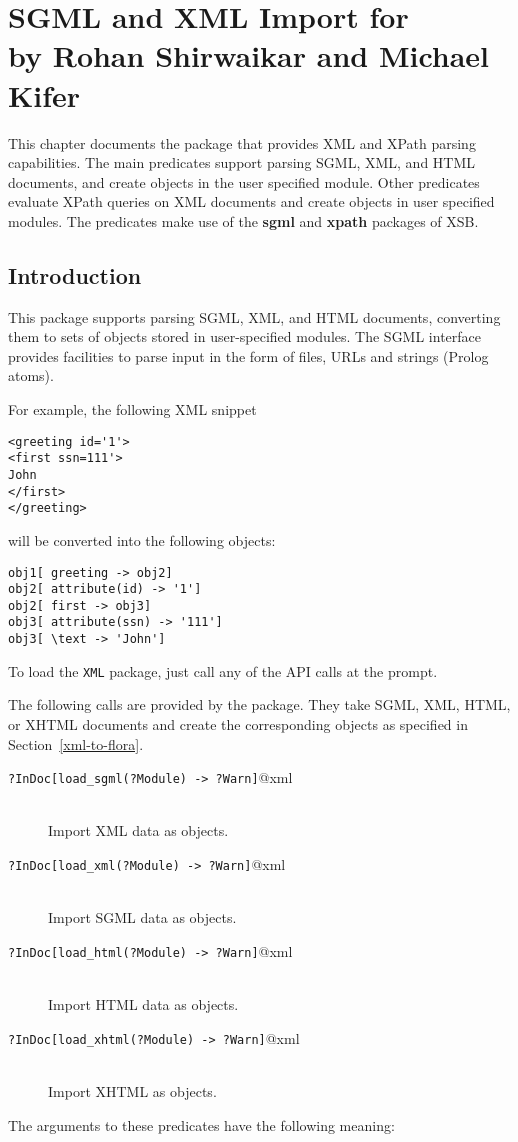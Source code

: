 \chapter[SGML and XML Parser for \FLSYSTEM]
{SGML and XML Import for \FLSYSTEM\\
  {\Large by Rohan Shirwaikar and Michael Kifer}}

This chapter documents the \FLSYSTEM package that provides XML
and XPath
parsing capabilities. The main predicates support parsing
SGML, XML, and HTML documents, and create \FLSYSTEM objects in the user
specified module.
Other predicates evaluate XPath queries
on XML documents and create \FLSYSTEM objects in user specified
modules. The predicates make use of the {\bf sgml} and {\bf xpath}
packages of XSB.



\section{Introduction}\label{sec-xml-intro}

This package supports parsing SGML, XML, and HTML documents,
converting them to sets of \FLSYSTEM objects stored in user-specified
\FLSYSTEM modules. The SGML interface
provides facilities to parse input in the form of files,
URLs and strings (Prolog atoms).  

For example, the following XML snippet

\begin{verbatim}
<greeting id='1'>
<first ssn=111'>
John
</first>
</greeting>
\end{verbatim}

will be converted into the following \FLSYSTEM objects:

\begin{verbatim}
obj1[ greeting -> obj2]
obj2[ attribute(id) -> '1']
obj2[ first -> obj3]
obj3[ attribute(ssn) -> '111']
obj3[ \text -> 'John']
\end{verbatim}

To load the {\tt XML} package, just call any of the API calls
at the \FLSYSTEM prompt.

The following calls are provided by the package.  They
take SGML, XML, HTML, or XHTML documents and create the corresponding
\FLSYSTEM objects as specified in Section~\ref{xml-to-flora}.

\begin{description}
\item[{\tt ?InDoc[load\_sgml(?Module) -> ?Warn]}@\bs{}xml]~~\\
  Import XML data as \FLSYSTEM objects.
\item[{\tt ?InDoc[load\_xml(?Module) -> ?Warn]}@\bs{}xml]~~\\
  Import SGML data as \FLSYSTEM objects.
\item[{\tt ?InDoc[load\_html(?Module) -> ?Warn]}@\bs{}xml]~~\\
  Import HTML data as \FLSYSTEM objects.
\item[{\tt ?InDoc[load\_xhtml(?Module) -> ?Warn]}@\bs{}xml]~~\\
  Import XHTML as \FLSYSTEM objects.
\end{description}
The arguments to these predicates have the following meaning:

